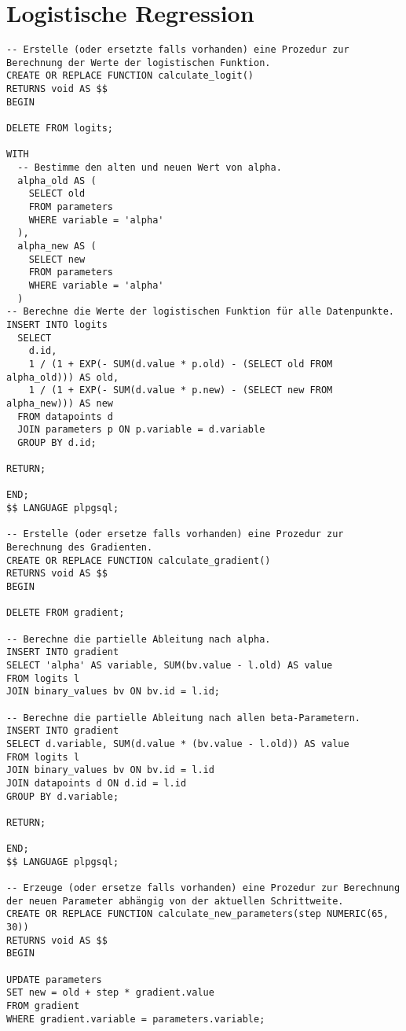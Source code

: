 \section{Logistische Regression}
\label{appendix:E:3}

\begin{verbatim}
-- Erstelle (oder ersetzte falls vorhanden) eine Prozedur zur Berechnung der Werte der logistischen Funktion.
CREATE OR REPLACE FUNCTION calculate_logit()
RETURNS void AS $$
BEGIN

DELETE FROM logits;

WITH
  -- Bestimme den alten und neuen Wert von alpha.
  alpha_old AS (
    SELECT old
    FROM parameters
    WHERE variable = 'alpha'
  ),
  alpha_new AS (
    SELECT new
    FROM parameters
    WHERE variable = 'alpha'
  )
-- Berechne die Werte der logistischen Funktion für alle Datenpunkte.
INSERT INTO logits
  SELECT
    d.id,
    1 / (1 + EXP(- SUM(d.value * p.old) - (SELECT old FROM alpha_old))) AS old,
    1 / (1 + EXP(- SUM(d.value * p.new) - (SELECT new FROM alpha_new))) AS new
  FROM datapoints d
  JOIN parameters p ON p.variable = d.variable
  GROUP BY d.id;

RETURN;

END;
$$ LANGUAGE plpgsql;

-- Erstelle (oder ersetze falls vorhanden) eine Prozedur zur Berechnung des Gradienten.
CREATE OR REPLACE FUNCTION calculate_gradient()
RETURNS void AS $$
BEGIN

DELETE FROM gradient;

-- Berechne die partielle Ableitung nach alpha.
INSERT INTO gradient
SELECT 'alpha' AS variable, SUM(bv.value - l.old) AS value
FROM logits l
JOIN binary_values bv ON bv.id = l.id;

-- Berechne die partielle Ableitung nach allen beta-Parametern.
INSERT INTO gradient
SELECT d.variable, SUM(d.value * (bv.value - l.old)) AS value
FROM logits l
JOIN binary_values bv ON bv.id = l.id
JOIN datapoints d ON d.id = l.id
GROUP BY d.variable;

RETURN;

END;
$$ LANGUAGE plpgsql;

-- Erzeuge (oder ersetze falls vorhanden) eine Prozedur zur Berechnung der neuen Parameter abhängig von der aktuellen Schrittweite.
CREATE OR REPLACE FUNCTION calculate_new_parameters(step NUMERIC(65, 30))
RETURNS void AS $$
BEGIN

UPDATE parameters
SET new = old + step * gradient.value
FROM gradient
WHERE gradient.variable = parameters.variable;


\end{verbatim}
